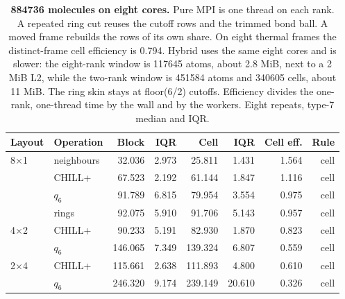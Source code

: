 \begin{table}[tbp]
\centering
\caption{\textbf{884736 molecules on eight cores.} Pure MPI is one thread on each rank. A repeated ring cut reuses the cutoff rows and the trimmed bond ball. A moved frame rebuilds the rows of its own share. On eight thermal frames the distinct-frame cell efficiency is 0.794. Hybrid uses the same eight cores and is slower: the eight-rank window is 117645 atoms, about 2.8 MiB, next to a 2 MiB L2, while the two-rank window is 451584 atoms and 340605 cells, about 11 MiB. The ring skin stays at floor(6/2) cutoffs. Efficiency divides the one-rank, one-thread time by the wall and by the workers. Eight repeats, type-7 median and IQR.}
\label{tab:partition-v17}
\begin{tabular}{llrrrrrr}
\toprule
Layout & Operation & Block & IQR & Cell & IQR & Cell eff. & Rule \\
\midrule
8$\times$1 & neighbours & 32.036 & 2.973 & 25.811 & 1.431 & 1.564 & cell \\
 & CHILL+ & 67.523 & 2.192 & 61.144 & 1.847 & 1.116 & cell \\
 & $q_6$ & 91.789 & 6.815 & 79.954 & 3.554 & 0.975 & cell \\
 & rings & 92.075 & 5.910 & 91.706 & 5.143 & 0.957 & cell \\
4$\times$2 & CHILL+ & 90.233 & 5.191 & 82.930 & 1.870 & 0.823 & cell \\
 & $q_6$ & 146.065 & 7.349 & 139.324 & 6.807 & 0.559 & cell \\
2$\times$4 & CHILL+ & 115.661 & 2.638 & 111.893 & 4.800 & 0.610 & cell \\
 & $q_6$ & 246.320 & 9.174 & 239.149 & 20.610 & 0.326 & cell \\
\bottomrule
\end{tabular}
\end{table}
